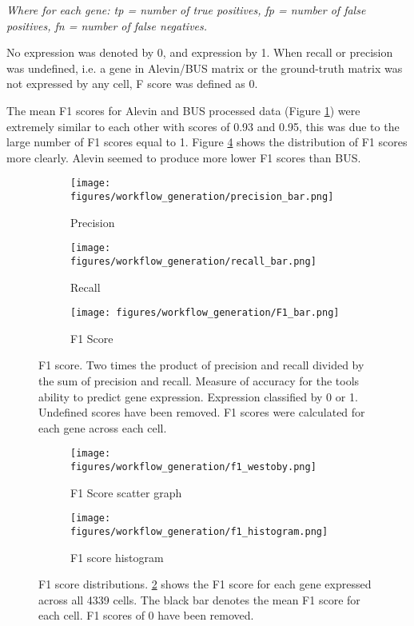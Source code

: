\textit{Where for each gene: tp = number of true positives, fp = number of false positives, fn = number of false negatives.}


No expression was denoted by 0, and expression by 1.
When recall or precision was undefined, i.e. a gene in Alevin/BUS matrix or the ground-truth matrix was not expressed by any cell, F score was defined as 0.

The mean F1 scores for Alevin and BUS processed data (Figure \ref{fig:precision_recall_f1_bar}) were extremely similar to each other with scores of 0.93 and 0.95, this was due to the large number of F1 scores equal to 1.
Figure \ref{fig:westoby_histogram} shows the distribution of F1 scores more clearly.
Alevin seemed to produce more lower F1 scores than BUS\@.

\begin{figure}[h]
\centering
\begin{subfigure}{0.32\textwidth}
    \texttt{[image: figures/workflow\_generation/precision\_bar.png]}
    \caption{Precision}
\end{subfigure}
\begin{subfigure}{0.32\textwidth}
    \texttt{[image: figures/workflow\_generation/recall\_bar.png]}
    \caption{Recall}
\end{subfigure}
\begin{subfigure}{0.32\textwidth}
    \centering
    \texttt{[image: figures/workflow\_generation/F1\_bar.png]}
    \caption{F1 Score}
\end{subfigure}
\caption[F1, Precision and Recall Bar Charts]{F1 score.
Two times the product of precision and recall divided by the sum of precision and recall.
Measure of accuracy for the tools ability to predict gene expression.
Expression classified by 0 or 1.
Undefined scores have been removed.
F1 scores were calculated for each gene across each cell.}
\label{fig:precision_recall_f1_bar}
\end{figure}
%
\begin{figure}[h]
\begin{subfigure}{0.5\textwidth}
    \texttt{[image: figures/workflow\_generation/f1\_westoby.png]}
    \caption{F1 Score scatter graph}
    \label{fig:f1_westoby}
\end{subfigure}
\begin{subfigure}{0.5\textwidth}
    \texttt{[image: figures/workflow\_generation/f1\_histogram.png]}
    \caption{F1 score histogram}
    \label{fig:f1_hist}
\end{subfigure}
\caption[Distribution of F1 scores]{F1 score distributions.
    \ref{fig:f1_westoby} shows the F1 score for each gene expressed across all 4339 cells.
    The black bar denotes the mean F1 score for each cell.
    F1 scores of 0 have been removed.}
\label{fig:westoby_histogram}
\end{figure}

